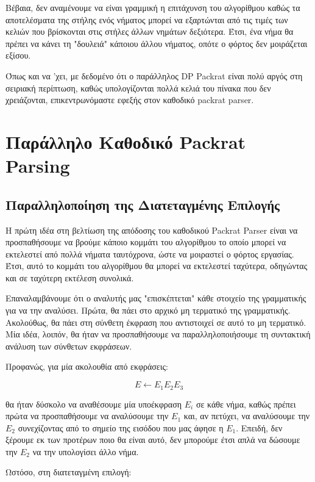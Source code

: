 Βέβαια, δεν αναμένουμε να είναι γραμμική η επιτάχυνση του αλγορίθμου καθώς τα αποτελέσματα της στήλης ενός νήματος μπορεί να εξαρτώνται από τις τιμές των κελιών που βρίσκονται στις στήλες άλλων νημάτων δεξιότερα.
Έτσι, ένα νήμα θα πρέπει να κάνει τη "δουλειά" κάποιου άλλου νήματος, οπότε ο φόρτος δεν μοιράζεται εξίσου.

Όπως και να 'χει, με δεδομένο ότι ο παράλληλος DP Packrat είναι πολύ αργός στη σειριακή περίπτωση, καθώς υπολογίζονται πολλά κελιά του πίνακα που δεν χρειάζονται, επικεντρωνόμαστε εφεξής στον καθοδικό packrat parser.

\section{Παράλληλο Καθοδικό Packrat Parsing}

\subsection{Παραλληλοποίηση της Διατεταγμένης Επιλογής}

Η πρώτη ιδέα στη βελτίωση της απόδοσης του καθοδικού Packrat Parser είναι να προσπαθήσουμε να βρούμε κάποιο κομμάτι του αλγορίθμου το οποίο μπορεί να εκτελεστεί από πολλά νήματα ταυτόχρονα, ώστε να μοιραστεί ο φόρτος εργασίας.
Έτσι, αυτό το κομμάτι του αλγορίθμου θα μπορεί να εκτελεστεί ταχύτερα, οδηγώντας και σε ταχύτερη εκτέλεση συνολικά.

Επαναλαμβάνουμε ότι ο αναλυτής μας "επισκέπτεται" κάθε στοιχείο της γραμματικής για να την αναλύσει.
Πρώτα, θα πάει στο αρχικό μη τερματικό της γραμματικής. 
Ακολούθως, θα πάει στη σύνθετη έκφραση που αντιστοιχεί σε αυτό το μη τερματικό.
Μία ιδέα, λοιπόν, θα ήταν να προσπαθήσουμε να παραλληλοποιήσουμε τη συντακτική ανάλυση των σύνθετων εκφράσεων.

Προφανώς, για μία ακολουθία από εκφράσεις:

\begin{equation}
	E \leftarrow E_1 E_2 E_3
\end{equation}

θα ήταν δύσκολο να αναθέσουμε μία υποέκφραση $E_i$ σε κάθε νήμα, καθώς πρέπει πρώτα να προσπαθήσουμε να αναλύσουμε την $E_1$ και, αν πετύχει, να αναλύσουμε την $E_2$ συνεχίζοντας από το σημείο της εισόδου που μας άφησε η $E_1$. 
Επειδή, δεν ξέρουμε εκ των προτέρων ποιο θα είναι αυτό, δεν μπορούμε έτσι απλά να δώσουμε την $E_2$ να την υπολογίσει άλλο νήμα.

Ωστόσο, στη διατεταγμένη επιλογή:

